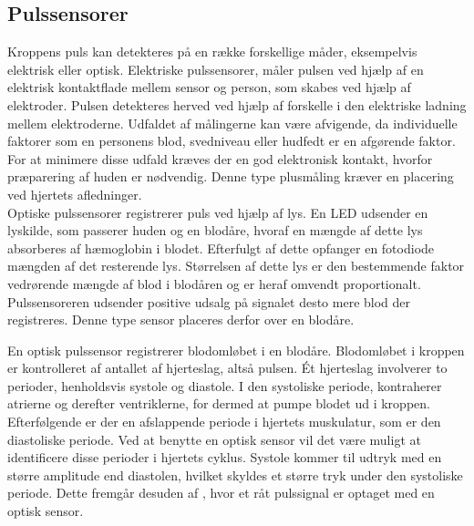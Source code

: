 \subsection{Pulssensorer}\label{sec:pulssensor}
Kroppens puls kan detekteres på en række forskellige måder, eksempelvis elektrisk eller optisk. Elektriske pulssensorer, måler pulsen ved hjælp af en elektrisk kontaktflade mellem sensor og person, som skabes ved hjælp af elektroder. Pulsen detekteres herved ved hjælp af forskelle i den elektriske ladning mellem elektroderne. Udfaldet af målingerne kan være afvigende, da individuelle faktorer som en personens blod, svedniveau eller hudfedt er en afgørende faktor. For at minimere disse udfald kræves der en god elektronisk kontakt, hvorfor præparering af huden er nødvendig. Denne type plusmåling kræver en placering ved hjertets afledninger. \citep{PhuaLissorguesMercier2009}  \\
Optiske pulssensorer registrerer puls ved hjælp af lys. En LED udsender en lyskilde, som passerer huden og en blodåre, hvoraf en mængde af dette lys absorberes af hæmoglobin i blodet. Efterfulgt af dette opfanger en fotodiode mængden af det resterende lys. Størrelsen af dette lys er den bestemmende faktor vedrørende mængde af blod i blodåren og er heraf omvendt proportionalt. Pulssensoreren udsender positive udsalg på signalet desto mere blod der registreres. Denne type sensor placeres derfor over en blodåre. \citep{PhuaLissorguesMercier2009,SrinivasReddySrinivas2006} 

En optisk pulssensor registrerer blodomløbet i en blodåre. Blodomløbet i kroppen er kontrolleret af antallet af hjerteslag, altså pulsen. Ét hjerteslag involverer to perioder, henholdsvis systole og diastole. I den systoliske periode, kontraherer atrierne og derefter ventriklerne, for dermed at pumpe blodet ud i kroppen. Efterfølgende er der en afslappende periode i hjertets muskulatur, som er den diastoliske periode. \newline
Ved at benytte en optisk sensor vil det være muligt at identificere disse perioder i hjertets cyklus. Systole kommer til udtryk med en større amplitude end diastolen, hvilket skyldes et større tryk under den systoliske periode. Dette fremgår desuden af , hvor et råt pulssignal er optaget med en optisk sensor. \citep{Martini2012}

